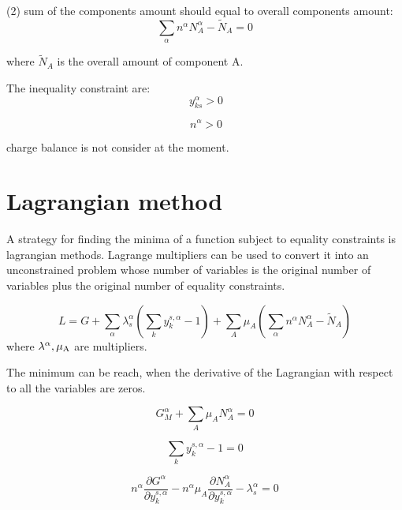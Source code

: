 \documentclass[12pt]{article}
\begin{document}
(2) sum of the components amount should equal to overall components amount:
\begin{equation}
\sum_{\alpha}n^{\alpha}N^{\alpha}_{A} - \tilde N_{A}=0
\end{equation}

\noindent
where ${\tilde N}_{A}$ is the overall amount of component A.



The inequality constraint are:
\begin{equation}
\ y^{\alpha}_{ks} > 0
\end{equation}

\begin{equation}
\ n^{\alpha} > 0
\end{equation}

\noindent
charge balance is not consider at the moment.


\section{Lagrangian method}
A strategy for finding the minima of a function subject to equality
constraints is lagrangian methods. Lagrange multipliers can be used
to convert it into an unconstrained problem whose number of variables
is the original number of variables plus the original number of
equality constraints.

\begin{equation}
L = G + \sum_{\alpha} \lambda_s^{\alpha} (\sum_k y^{s, \alpha}_{k} - 1)
+ \sum_{A} \mu_{A}(\sum_{\alpha}n^{\alpha}N^{\alpha}_{A} - \tilde N_{A})
\end{equation}
\noindent
where $\lambda^{\alpha}, \mu_{\rm A}$ are multipliers.

The minimum can be reach, when the derivative of the Lagrangian with
respect to all the variables are zeros.

\begin{equation}
G^{\alpha}_M + \sum_{A} \mu_{A} N^{\alpha}_{A} = 0
\end{equation}

\begin{equation}
\sum_k y^{s, \alpha}_{k} - 1= 0
\end{equation}

\begin{equation}
n^{\alpha}\frac{\partial G^{\alpha}}{\partial y^{s, \alpha}_{k}}
- n^{\alpha}\mu_{A}\frac{\partial N^{\alpha}_{A}}{\partial y^{s, \alpha}_{k}}
- \lambda_s^{\alpha} = 0
\end{equation}
\end{document}
